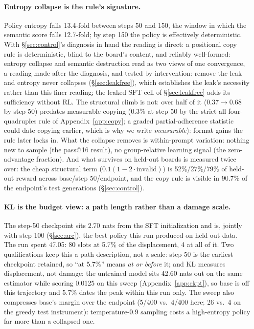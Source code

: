 \documentclass{article}
\begin{document}
\paragraph{Entropy collapse is the rule's signature.} Policy entropy falls
13.4-fold between steps 50 and 150, the window in which the semantic score
falls 12.7-fold; by step 150 the policy is effectively deterministic. With
\S\ref{sec:control}'s diagnosis in hand the reading is direct: a positional
copy rule is deterministic, blind to the board's content, and reliably
well-formed: entropy collapse and semantic destruction read as two views of one convergence, a reading made after the diagnosis, and tested by intervention: remove the leak and entropy never collapses (\S\ref{sec:leakfree}), which establishes the leak's necessity rather than this finer reading; the leaked-SFT cell of \S\ref{sec:leakfree} adds its sufficiency without RL. The structural climb is not: over half of it ($0.37
\to 0.68$ by step 50) predates measurable copying (0.3\% at step 50 by the strict all-four-quadruples rule of Appendix~\ref{app:copy}; a graded partial-adherence statistic could date copying earlier, which is why we write \emph{measurable}): format gains the rule later locks in. What the collapse
removes is within-prompt variation: nothing new to sample (the pass@16
result), no group-relative learning signal (the zero-advantage fraction).
And what survives on held-out boards is measured twice over: the cheap structural term ($0.1(1-2\cdot\text{invalid})$) is 52\%/27\%/79\% of held-out reward across base/step 50/endpoint, and the copy rule is visible in 90.7\% of the endpoint's test generations (\S\ref{sec:control}).

\paragraph{KL is the budget view: a path length rather than a damage
scale.} The step-50 checkpoint sits 2.70 nats
from the SFT initialization and is, jointly with step 100
(\S\ref{sec:arc}), the best policy this run produced on
held-out data. The run spent 47.05: 80 slots at 5.7\% of
the displacement, 4 at all of it.
Two qualifications keep this a path description, not a scale: step 50 is
the earliest checkpoint retained, so ``at 5.7\%'' means \emph{at or
before} it; and KL measures displacement, not damage; the untrained model sits 42.60 nats out on the same estimator while scoring 0.0125 on this sweep (Appendix~\ref{app:ckpt}), so base is off this trajectory and 5.7\% dates the peak within this run only. The sweep also
compresses base's margin over the endpoint (5/400 vs.\ 4/400 here; 26 vs.\
4 on the greedy test instrument): temperature-0.9 sampling costs a
high-entropy policy far more than a collapsed one.
\end{document}
